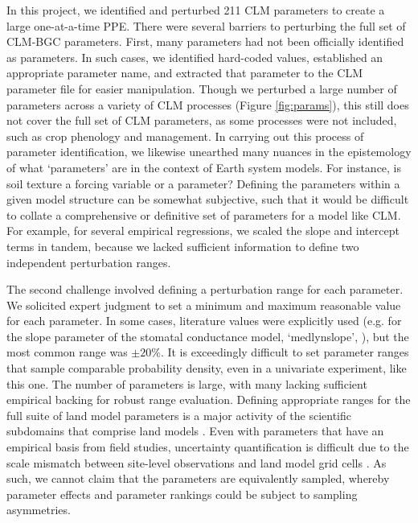 \documentclass[draft]{agujournal2019}
\begin{document}
In this project, we identified and perturbed 211 CLM parameters to create a large one-at-a-time PPE. There were several barriers to perturbing the full set of CLM-BGC parameters. First, many parameters had not been officially identified as parameters. In such cases, we identified hard-coded values, established an appropriate parameter name, and extracted that parameter to the CLM parameter file for easier manipulation. Though we perturbed a large number of parameters across a variety of CLM processes (Figure \ref{fig:params}), this still does not cover the full set of CLM parameters, as some processes were not included, such as crop phenology and management. In carrying out this process of parameter identification, we likewise unearthed many nuances in the epistemology of what `parameters' are in the context of Earth system models. For instance, is soil texture a forcing variable or a parameter? Defining the parameters within a given model structure can be somewhat subjective, such that it would be difficult to collate a comprehensive or definitive set of parameters for a model like CLM. For example, for several empirical regressions, we scaled the slope and intercept terms in tandem, because we lacked sufficient information to define two independent perturbation ranges.

The second challenge involved defining a perturbation range for each parameter. We solicited expert judgment to set a minimum and maximum reasonable value for each parameter. In some cases, literature values were explicitly used (e.g. for the slope parameter of the stomatal conductance model, `medlynslope', ), but the most common range was $\pm20\%$. It is exceedingly difficult to set parameter ranges that sample comparable probability density, even in a univariate experiment, like this one. The number of parameters is large, with many lacking sufficient empirical backing for robust range evaluation. Defining appropriate ranges for the full suite of land model parameters is a major activity of the scientific subdomains that comprise land models \cite{kattge2020}. Even with parameters that have an empirical basis from field studies, uncertainty quantification is difficult due to the scale mismatch between site-level observations and land model grid cells \cite{liu2021}. As such, we cannot claim that the parameters are equivalently sampled, whereby parameter effects and parameter rankings could be subject to sampling asymmetries.
\end{document}
